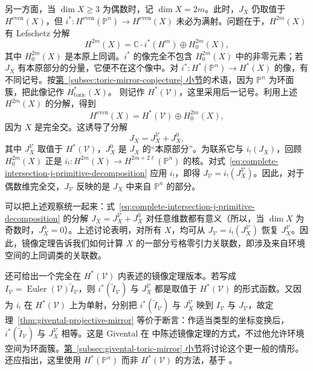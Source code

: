 另一方面，当 $\dim X\ge3$ 为偶数时，记 $\dim X=2m$。此时，$J_X$ 仍取值于 $H^{\mathrm{even}}(X)$，但 $i^*:H^{\mathrm{even}}(\mathbb P^n)\to H^{\mathrm{even}}(X)$ 未必为满射。问题在于，$H^{2m}(X)$ 有 Lefschetz 分解
\[
H^{2m}(X)=\mathbb C\cdot i^*(H^m)\oplus H_0^{2m}(X),
\]
其中 $H_0^{2m}(X)$ 是本原上同调。$i^*$ 的像完全不包含 $H_0^{2m}(X)$ 中的非零元素；若 $J_X$ 有本原部分的分量，它便不在这个像中。对 $i^*:H^*(\mathbb P^n)\to H^*(X)$ 的像，有不同记号。按\hyperref[subsec:toric-mirror-conjecture]{第~\ref*{subsec:toric-mirror-conjecture} 小节}的术语，因为 $\mathbb P^n$ 为环面簇，把此像记作 $H_{\mathrm{toric}}^*(X)$。 则记作 $H^*(\mathcal V)$，这里采用后一记号。利用上述 $H^{2m}(X)$ 的分解，得到
\[
H^{\mathrm{even}}(X)=H^*(\mathcal V)\oplus H_0^{2m}(X),
\]
因为 $X$ 是完全交。这诱导了分解
\begin{equation}\label{eq:complete-intersection-j-primitive-decomposition}
J_X=J_X^{\mathcal V}+J_X^0,
\end{equation}
其中 $J_X^{\mathcal V}$ 取值于 $H^*(\mathcal V)$，$J_X^0$ 是 $J_X$ 的“本原部分”。为联系它与 $i_!(J_X)$，回顾 $H_0^{2m}(X)$ 正是 $i_!:H^{2m}(X)\to H^{2m+2\ell}(\mathbb P^n)$ 的核。对式~\eqref{eq:complete-intersection-j-primitive-decomposition} 应用 $i_!$，即得 $J_{\mathcal V}=i_!(J_X^{\mathcal V})$。因此，对于偶数维完全交，$J_{\mathcal V}$ 反映的是 $J_X$ 中来自 $\mathbb P^n$ 的部分。

可以把上述观察统一起来：式~\eqref{eq:complete-intersection-j-primitive-decomposition} 的分解 $J_X=J_X^{\mathcal V}+J_X^0$ 对任意维数都有意义（所以，当 $\dim X$ 为奇数时，$J_X^0=0$）。上述讨论表明，对所有 $X$，均可从 $J_{\mathcal V}=i_!(J_X^{\mathcal V})$ 恢复 $J_X^{\mathcal V}$。因此，镜像定理告诉我们如何计算 $X$ 的一部分亏格零引力关联数，即涉及来自环境空间的上同调类的关联数。

还可给出一个完全在 $H^*(\mathcal V)$ 内表述的镜像定理版本。若写成 $I_{\mathcal V}=\operatorname{Euler}(\mathcal V)\widetilde I_{\mathcal V}$，则 $i^*(\widetilde I_{\mathcal V})$ 与 $J_X^{\mathcal V}$ 都是取值于 $H^*(\mathcal V)$ 的形式函数。又因为 $i_!$ 在 $H^*(\mathcal V)$ 上为单射，分别把 $i^*(\widetilde I_{\mathcal V})$ 与 $J_X^{\mathcal V}$ 映到 $I_{\mathcal V}$ 与 $J_{\mathcal V}$，故定理~\ref{thm:givental-projective-mirror} 等价于断言：作适当类型的坐标变换后，$i^*(\widetilde I_{\mathcal V})$ 与 $J_X^{\mathcal V}$ 相等。这是 Givental 在  中陈述镜像定理的方式，不过他允许环境空间为环面簇。\hyperref[subsec:givental-toric-mirror]{第~\ref*{subsec:givental-toric-mirror} 小节}将讨论这个更一般的情形。还应指出，这里使用 $H^*(\mathbb P^n)$ 而非 $H^*(\mathcal V)$ 的方法，基于 。

